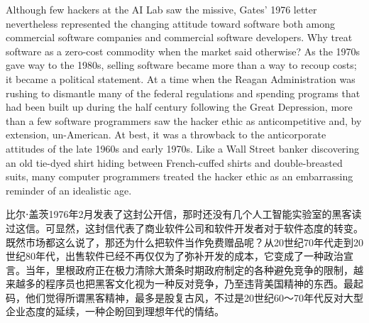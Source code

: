 \ifdefined\eng
Although few hackers at the AI Lab saw the missive, Gates' 1976 letter nevertheless represented the changing attitude toward software both among commercial software companies and commercial software developers. Why treat software as a zero-cost commodity when the market said otherwise? As the 1970s gave way to the 1980s, selling software became more than a way to recoup costs; it became a political statement. At a time when the Reagan Administration was rushing to dismantle many of the federal regulations and spending programs that had been built up during the half century following the Great Depression, more than a few software programmers saw the hacker ethic as anticompetitive and, by extension, un-American. At best, it was a throwback to the anticorporate attitudes of the late 1960s and early 1970s. Like a Wall Street banker discovering an old tie-dyed shirt hiding between French-cuffed shirts and double-breasted suits, many computer programmers treated the hacker ethic as an embarrassing reminder of an idealistic age.
\fi

\ifdefined\chs
比尔⋅盖茨1976年2月发表了这封公开信，那时还没有几个人工智能实验室的黑客读过这信。可显然，这封信代表了商业软件公司和软件开发者对于软件态度的转变。既然市场都这么说了，那还为什么把软件当作免费赠品呢？从20世纪70年代走到20世纪80年代，出售软件已经不再仅仅为了弥补开发的成本，它变成了一种政治宣言。当年，里根政府正在极力清除大萧条时期政府制定的各种避免竞争的限制，越来越多的程序员也把黑客文化视为一种反对竞争，乃至违背美国精神的东西。最起码，他们觉得所谓黑客精神，最多是股复古风，不过是20世纪60～70年代反对大型企业态度的延续，一种企盼回到理想年代的情结。
\fi

